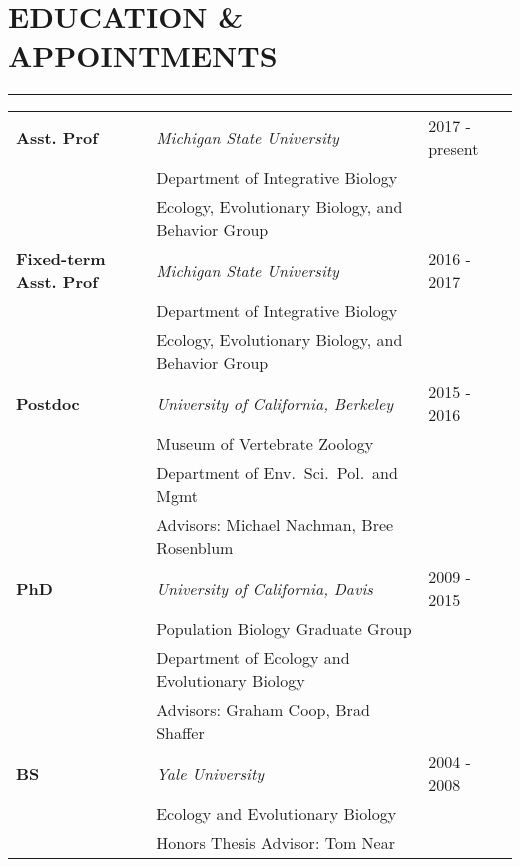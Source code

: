 \documentclass{article}
\begin{document}
\section*{EDUCATION \& APPOINTMENTS}
\vspace{-0.6cm}
\rule{470pt}{0.4pt}
%
\begin{tabular}{p{} p{} p{}} 
\\
\bf{Asst. Prof} & \it{Michigan State University} & \hfill 2017 - present\\
 & \hspace{0.5cm}Department of Integrative Biology & \\
 & \hspace{0.5cm}Ecology, Evolutionary Biology, and Behavior Group& \\
%
%
\bf{Fixed-term Asst. Prof} & \it{Michigan State University} & \hfill 2016 - 2017\\
 & \hspace{0.5cm}Department of Integrative Biology & \\
 & \hspace{0.5cm}Ecology, Evolutionary Biology, and Behavior Group& \\
%
%
\bf{Postdoc} & \it{University of California, Berkeley} & \hfill 2015 - 2016\\
 & \hspace{0.5cm}Museum of Vertebrate Zoology & \\
 & \hspace{0.5cm}Department of Env.\ Sci.\ Pol.\ and Mgmt& \\
 & \hspace{0.5cm}Advisors: Michael Nachman, Bree Rosenblum & \\ 
%
%
\bf{PhD} & \it{University of California, Davis}  & \hfill 2009 - 2015\\
 & \hspace{0.5cm}Population Biology Graduate Group & \\
 & \hspace{0.5cm}Department of Ecology and Evolutionary Biology & \\
 & \hspace{0.5cm}Advisors: Graham Coop, Brad Shaffer & \\ 
%
%
\textbf{BS} & \it{Yale University} & \hfill 2004 - 2008 \\
& \hspace{0.5cm}Ecology and Evolutionary Biology & \\
& \hspace{0.5cm}Honors Thesis Advisor: Tom Near & \\
\end{tabular}
%
\vspace{0.1cm}
\end{document}
